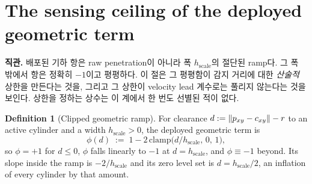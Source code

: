 \documentclass[11pt]{article}
\theoremstyle{plain}
\theoremstyle{definition}
\newtheorem{definition}[theorem]{Definition}
\theoremstyle{remark}
\DeclarePairedDelimiter{\norm}{\lVert}{\rVert}
\newcommand{\eqdef}{:=}
\begin{document}
\section{The sensing ceiling of the deployed geometric term}\label{sec:ramp}

\textbf{직관.} 배포된 기하 항은 raw penetration이 아니라 폭 $h_{\mathrm{scale}}$의 절단된
ramp다. 그 폭 밖에서 항은 정확히 $-1$이고 평평하다. 이 절은 그 평평함이 감지 거리에 대한
\emph{산술적} 상한을 만든다는 것을, 그리고 그 상한이 velocity lead 계수로는 풀리지 않는다는 것을
보인다. 상한을 정하는 상수는 이 계에서 한 번도 선별된 적이 없다.

\begin{definition}[Clipped geometric ramp]\label{def:ramp}
For clearance $d\eqdef\norm{p_{xy}-c_{xy}}-r$ to an active cylinder and a width
$h_{\mathrm{scale}}>0$, the deployed geometric term is
\begin{equation}\label{eq:ramp}
\phi(d)\;\eqdef\;1-2\,\mathrm{clamp}\!\big(d/h_{\mathrm{scale}},\,0,\,1\big),
\end{equation}
so $\phi=+1$ for $d\le0$, $\phi$ falls linearly to $-1$ at $d=h_{\mathrm{scale}}$, and
$\phi\equiv-1$ beyond. Its slope inside the ramp is $-2/h_{\mathrm{scale}}$ and its zero level
set is $d=h_{\mathrm{scale}}/2$, an inflation of every cylinder by that amount.
\end{definition}
\end{document}
